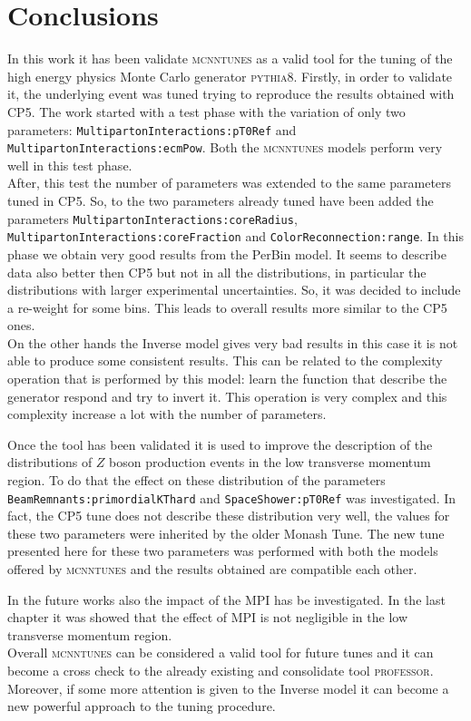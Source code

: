 \chapter*{Conclusions}

In this work it has been validate \textsc{mcnntunes} as a valid tool for the tuning of the high energy physics Monte Carlo generator \textsc{pythia8}. Firstly, in order to validate it, the underlying event was tuned trying to reproduce the results obtained with CP5. The work started with a test phase with the variation of only two parameters: \texttt{MultipartonInteractions:}\-\texttt{pT0Ref} and \texttt{MultipartonInteractions:}\-\texttt{ecmPow}. Both the \textsc{mcnntunes} models perform very well in this test phase. 
\\
After, this test the number of parameters was extended to the same parameters tuned in CP5. So, to the two parameters already tuned have been added the parameters \texttt{MultipartonInteractions:}\-\texttt{core}\-\texttt{Radius}, \texttt{MultipartonInteractions:}\-\texttt{core}\-\texttt{Fraction} and \texttt{ColorReconnection:}\-\texttt{range}. In this phase we obtain very good results from the PerBin model. It seems to describe data also better then CP5 but not in all the distributions, in particular the distributions with larger experimental uncertainties. So, it was decided to include a re-weight for some bins. This leads to overall results more similar to the CP5 ones.
\\
On the other hands the Inverse model gives very bad results in this case it is not able to produce some consistent results.
This can be related to the complexity operation that is performed by this model: learn the function that describe the generator respond and try to invert it. This operation is very complex and this complexity increase a lot with the number of parameters.

Once the tool has been validated it is used to improve the description of the distributions of $Z$ boson production events in the low transverse momentum region. To do that the effect on these distribution of the parameters \texttt{BeamRemnants:}\-\texttt{primordialKT}\-\texttt{hard} and \texttt{SpaceShower:}\-\texttt{pT0Ref} was investigated. In fact, the CP5 tune does not describe these distribution very well, the values for these two parameters were inherited by the older Monash Tune. 
The new tune presented here for these two parameters was performed with both the models offered by \textsc{mcnntunes} and the results obtained are compatible each other. 

In the future works also the impact of the MPI has be investigated. In the last chapter it was showed that the effect of MPI is not negligible in the low transverse momentum region.
\\
Overall \textsc{mcnntunes} can be considered a valid tool for future tunes and it can become a cross check to the already existing and consolidate tool \textsc{professor}. Moreover, if some more attention is given to the Inverse model it can become a new powerful approach to the tuning procedure.
 